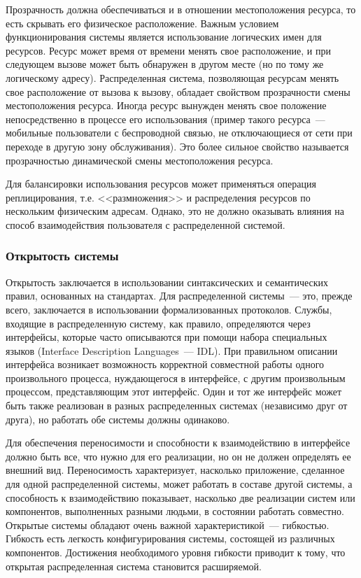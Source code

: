 Прозрачность должна обеспечиваться и в отношении местоположения ресурса, то есть скрывать его физическое расположение. Важным условием функционирования системы является использование логических имен для ресурсов. Ресурс может время от времени менять свое расположение, и при следующем вызове может быть обнаружен в другом месте (но по тому же логическому адресу). Распределенная система, позволяющая ресурсам менять свое расположение от вызова к вызову, обладает свойством прозрачности смены местоположения ресурса. Иногда ресурс вынужден менять свое положение непосредственно в процессе его использования (пример такого ресурса~--- мобильные пользователи с беспроводной связью, не отключающиеся от сети при переходе в другую зону обслуживания). Это более сильное свойство называется прозрачностью динамической смены местоположения ресурса.

Для балансировки использования ресурсов может применяться операция реплицирования, т.е. <<размножения>> и распределения ресурсов по нескольким физическим адресам. Однако, это не должно оказывать влияния на способ взаимодействия пользователя с распределенной системой.
\subsubsection{Открытость системы}
Открытость заключается в использовании синтаксических и семантических правил, основанных на стандартах. Для распределенной системы~--- это, прежде всего, заключается в использовании формализованных протоколов. Службы, входящие в распределенную систему, как правило, определяются через интерфейсы, которые часто описываются при помощи набора специальных языков (Interface Description Languages~--- IDL). При правильном описании интерфейса возникает возможность корректной совместной работы одного произвольного процесса, нуждающегося в интерфейсе, с другим произвольным процессом, представляющим этот интерфейс. Один и тот же интерфейс может быть также реализован в разных распределенных системах (независимо друг от друга), но работать обе системы должны одинаково.

Для обеспечения переносимости и способности к взаимодействию в интерфейсе должно быть все, что нужно для его реализации, но он не должен определять ее внешний вид. Переносимость характеризует, насколько приложение, сделанное для одной распределенной системы, может работать в составе другой системы, а способность к взаимодействию показывает, насколько две реализации систем или компонентов, выполненных разными людьми, в состоянии работать совместно. Открытые системы обладают очень важной характеристикой~--- гибкостью. Гибкость есть легкость конфигурирования системы, состоящей из различных компонентов. Достижения необходимого уровня гибкости приводит к тому, что открытая распределенная система становится расширяемой.

